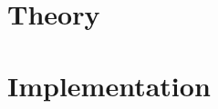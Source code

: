 \documentclass[
paper=a4,
fontsize = 12pt, %
headsepline,     %
titlepage,       %
numbers=noenddot,
headings=optiontohead, %
]{scrbook}
\begin{document}
\frontmatter
{}
\cofoot[\pagemark]{}
\rofoot[]{}



\tableofcontents
\listoffigures
\listoftables


\printnomenclature

\mainmatter
{}

\rofoot[]{\pagemark}





\part{Theory}\label{part:theory}
















\part{Implementation}\label{part:implementation}




\end{document}
